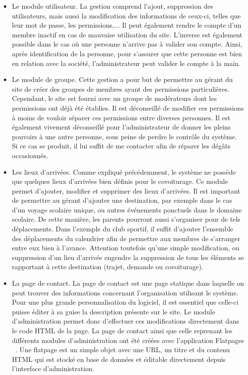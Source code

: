 \documentclass[12pt, a4paper, oneside]{article}
\begin{document}
    \begin{itemize}
        \item Le module utilisateur. La gestion comprend l'ajout, suppression des utilisateurs, mais aussi la modification des informations de ceux-ci, telles que leur mot de passe, les permissions,... Il peut également rendre le compte d'un membre inactif en cas de mauvaise utilisation du site. L'inverse est également possible dans le cas où une personne n'arrive pas à valider son compte. Ainsi, après identification de la personne, pour s'assurer que cette personne est bien en relation avec la société, l'administrateur peut valider le compte à la main.\\
        \item Le module de groupe. Cette gestion a pour but de permettre au gérant du site de créer des groupes de membres ayant des permissions particulières. Cependant, le site est fourni avec un groupe de modérateurs dont les permissions ont déjà été établies. Il est déconseillé de modifier ces permissions à moins de vouloir séparer ces permissions entre diverses personnes. Il est également vivement déconseillé pour l'administrateur de donner les pleins pouvoirs à une autre personne, sous peine de perdre le contrôle du système. Si ce cas se produit, il lui suffit de me contacter afin de réparer les dégâts occasionnés.
        \item Les lieux d'arrivées. Comme expliqué précédemment, le système ne possède que quelques lieux d'arrivées bien définis pour le covoiturage. Ce module permet d'ajouter, modifier et supprimer des lieux d'arrivées. Il est important de permettre au gérant d'ajouter une destination, par exemple dans le cas d'un voyage scolaire unique, ou autres événements ponctuels dans le domaine scolaire. De cette manière, les parents pourront aussi s'organiser pour de tels déplacements. Dans l'exemple du club sportif, il suffit d'ajouter l'ensemble des déplacements du calendrier afin de permettre aux membres de s'arranger entre eux bien à l'avance. Attention toutefois qu'une simple modification, ou suppression d'un lieu d'arrivée engendre la suppression de tous les éléments se rapportant à cette destination (trajet, demande ou covoiturage).
        \item La page de contact. La page de contact est une page statique dans laquelle on peut trouver des informations concernant l'organisation utilisant le système. Pour une plus grande personnalisation du logiciel, il est essentiel que celle-ci puisse éditer à sa guise la description présente sur le site. Le module d'administration permet donc d'effectuer ces modifications directement dans le code HTML de la page. La page de contact ainsi que celle reprenant les différents modules d'administration ont été créées avec l'application Flatpages ~\cite{django-flatpage}. Une flatpage est un simple objet avec une URL, un titre et du contenu HTML qui est stocké en base de données et éditable directement depuis l'interface d'administration.

\end{itemize}
\end{document}
